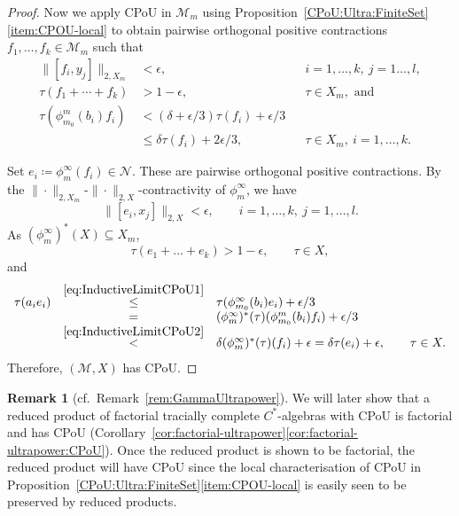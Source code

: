\documentclass[a4paper,11pt]{amsart}
\theoremstyle{definition}
\newtheorem{remark}[theorem]{Remark}
\numberwithin{equation}{section}
\numberwithin{theorem}{section}
\newcommand{\M}{\mathcal{M}}
\begin{document}
\begin{proof}
	Now we apply CPoU in $\M_m$ using Proposition~\ref{CPoU:Ultra:FiniteSet}\ref{item:CPOU-local} to obtain pairwise orthogonal positive contractions $f_1,\dots,f_k\in\M_m$ such that
	\begin{equation}\begin{aligned}\label{eq:InductiveLimitCPoU2}
		\|[f_i,y_j]\|_{2,X_m} &<\epsilon,&&i=1,\dots,k,\ j=1\dots,l,  \\
		\tau(f_1+\cdots+f_k) &> 1-\epsilon, && \tau \in X_m, \text{ and}  \\
		\tau(\phi_{m_0}^m(b_i)f_i) &< (\delta+\epsilon/3)\tau(f_i) + \epsilon/3  \\
		&\leq \delta\tau(f_i)+2\epsilon/3, && \tau \in X_m,\ i=1,\dots,k.
	\end{aligned}\end{equation}
	
	Set $e_i\coloneqq\phi_m^\infty(f_i)\in \mathcal N$.  These are pairwise orthogonal positive contractions. By the $\|\cdot\|_{2,X_m}$-$\|\cdot\|_{2,X}$-contractivity of $\phi_m^\infty$, we have
	\begin{equation}
		\|[e_i,x_j]\|_{2,X}<\epsilon, \qquad i =1, \ldots, k, \ j=1, \ldots, l.
	\end{equation}
	As $(\phi_m^\infty)^*(X)\subseteq X_m$,
	\begin{equation}
		\tau(e_1+\dots+e_k)>1-\epsilon,\qquad \tau\in X,
	\end{equation}
	and
	\begin{equation}\begin{array}{rcl}
		\tau(a_ie_i)&\stackrel{\eqref{eq:InductiveLimitCPoU1}}\leq& \tau(\phi_{m_0}^\infty(b_i)e_i)+\epsilon/3  \\
		&=& (\phi_m^\infty)^*(\tau)(\phi_{m_0}^m(b_i)f_i)+\epsilon/3  \\
		&\stackrel{\eqref{eq:InductiveLimitCPoU2}}<&\delta(\phi_m^\infty)^*(\tau)(f_i)+\epsilon=\delta\tau(e_i)+\epsilon,\qquad \tau\in X.
	\end{array}\end{equation}
	Therefore, $(\mathcal M, X)$ has CPoU.
\end{proof}

\begin{remark}[cf.\ Remark~\ref{rem:GammaUltrapower}]\label{rem:reduced-products-CPoU}
	We will later show that a reduced product of factorial tracially complete $C^*$-algebras with CPoU is factorial and has CPoU (Corollary~\ref{cor:factorial-ultrapower}\ref{cor:factorial-ultrapower:CPoU}).  Once the reduced product is shown to be factorial, the reduced product will have CPoU since the local characterisation of CPoU in Proposition~\ref{CPoU:Ultra:FiniteSet}\ref{item:CPOU-local} is easily seen to be preserved by reduced products.
\end{remark}
\end{document}
